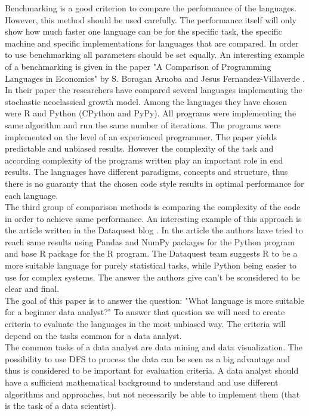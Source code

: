 \documentclass[
  twoside,
  11pt, a4paper,
  footinclude=true,
  headinclude=true,
  cleardoublepage=empty
]{scrreprt}
\begin{document}
        Benchmarking is a good criterion to compare the performance of the languages. However, this method should be used carefully. The performance itself will only show how much faster one language can be for the specific task, the specific machine and specific implementations for languages that are compared. In order to use benchmarking all parameters should be set equally. An interesting example of a benchmarking is given in the paper "A Comparison of Programming Languages in Economics" by S. Boragan Aruoba and Jesus Fernandez-Villaverde \cite{article:LanguageComparison}. In their paper the researchers have compared several languages implementing the stochastic neoclassical growth model. Among the languages they have chosen were R and Python (CPython and PyPy). All programs were implementing the same algorithm and run the same number of iterations. The programs were implemented on the level of an experienced programmer. The paper yields predictable and unbiased results. However the complexity of the task and according complexity of the programs written play an important role in end results. The languages have different paradigms, concepts and structure, thus there is no guaranty that the chosen code style results in optimal performance for each language.\\
        The third group of comparison methods is comparing the complexity of the code in order to achieve same performance. An interesting example of this approach is the article written in the Dataquest blog \cite{dataQuest:LanguageComparison}. In the article the authors have tried to reach same results using Pandas and NumPy packages for the Python program and base R package for the R program. The Dataquest team suggests R to be a more suitable language for purely statistical tasks, while Python being easier to use for complex systems. The answer the authors give can't be sconsidered to be clear and final.\\
        The goal of this paper is to answer the question: "What language is more suitable for a beginner data analyst?" To answer that question we will need to create criteria to evaluate the languages in the most unbiased way. The criteria will depend on the tasks common for a data analyst.\\
        The common tasks of a data analyst are data mining and data visualization. The possibility to use DFS to process the data can be seen as a big advantage and thus is considered to be important for evaluation criteria. A data analyst should have a sufficient mathematical background to understand and use different algorithms and approaches, but not necessarily be able to implement them (that is the task of a data scientist).\\
    
\end{document}
